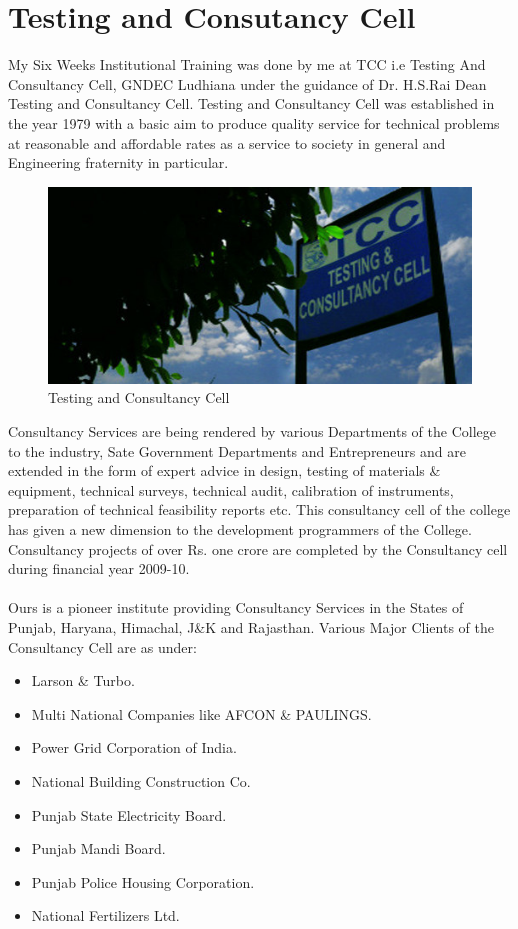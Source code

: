 \section{Testing and Consutancy Cell}
My Six Weeks Institutional Training was done by me at TCC i.e Testing And
Consultancy Cell,
GNDEC Ludhiana under the guidance of Dr. H.S.Rai Dean Testing and Consultancy Cell.
Testing and Consultancy Cell was established in the year 1979 with a basic aim to produce
quality service for technical problems at reasonable and affordable rates as a service to society
in general and Engineering fraternity in particular.\\
\begin{figure}[ht]
\centering
\includegraphics[scale=0.9]{images/aw.jpg}
\caption{Testing and Consultancy Cell}
\end{figure}
\hspace{-1.7em} Consultancy Services are being rendered by various Departments of the College to the
industry, Sate Government Departments and Entrepreneurs and are extended in the form of
expert advice in design, testing of materials \& equipment, technical surveys, technical audit,
calibration of instruments, preparation of technical feasibility reports etc.
This consultancy cell of the college has given a new dimension to the development
programmers of the College. Consultancy projects of over Rs. one crore are completed by the
Consultancy cell during financial year 2009-10. \\ \\
Ours is a pioneer institute providing Consultancy Services in the States of Punjab, Haryana,
Himachal, J\&K and Rajasthan. Various Major Clients of the Consultancy Cell are as under:\\
\begin{itemize}
\item Larson \& Turbo.
\item Multi National Companies like AFCON \& PAULINGS.
\item Power Grid Corporation of India.
\item National Building Construction Co.
\item Punjab State Electricity Board.
\item Punjab Mandi Board.
\item Punjab Police Housing Corporation.
\item National Fertilizers Ltd.
\end{itemize}

